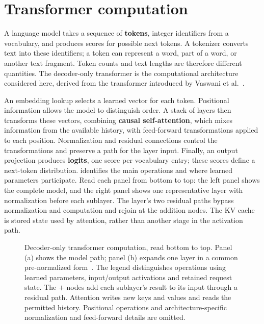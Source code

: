 \section{Transformer computation}
\label{sec:llm-inference-foundations}

A language model takes a sequence of \textbf{tokens}, integer identifiers
from a vocabulary, and produces scores for possible next tokens.  A
tokenizer converts text into these identifiers; a token can represent a
word, part of a word, or another text fragment.  Token counts and text
lengths are therefore different quantities.  The decoder-only
transformer is the computational architecture considered here, derived
from the transformer introduced by Vaswani et al.~\cite{vaswani2017attention}.

An embedding lookup selects a learned vector for each token.  Positional
information allows the model to distinguish order.  A stack of layers
then transforms these vectors, combining \textbf{causal self-attention},
which mixes information from the available history, with feed-forward
transformations applied to each position.  Normalization and residual
connections control the transformations and preserve a path for the
layer input.  Finally, an output projection produces \textbf{logits}, one
score per vocabulary entry; these scores define a next-token distribution.
 identifies the main operations and
where learned parameters participate.  Read each panel from bottom to
top: the left panel shows the complete model, and the right panel shows
one representative layer with normalization before each sublayer.
The layer's two residual paths bypass normalization and computation and
rejoin at the addition nodes.  The KV cache is stored state used by
attention, rather than another stage in the activation path.

\begin{figure}[htbp]
\centering

\caption{Decoder-only transformer computation, read bottom to top.
Panel (a) shows the model path; panel (b) expands one layer in a common
pre-normalized form~\cite{metallamamodel2026}.  The legend distinguishes
operations using learned parameters, input/output activations and retained
request state.  The
$+$ nodes add each sublayer's result to its input through a residual
path.  Attention writes new keys and
values and reads the permitted history.  Positional operations and
architecture-specific normalization and feed-forward details are omitted.}
\label{fig:transformer-overview}
\end{figure}

